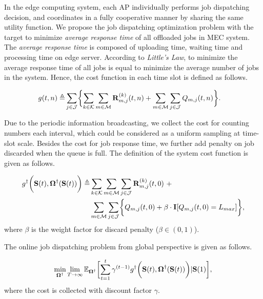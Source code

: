 In the edge computing system, each AP individually performs job dispatching decision, and coordinates in a fully cooperative manner by sharing the same utility function.
We propose the job dispatching optimization problem with the target to minimize \emph{average response time} of all offloaded jobs in MEC system.
The \emph{average response time} is composed of uploading time, waiting time and processing time on edge server.
According to \emph{Little's Law}, to minimize the average response time of all jobs is equal to minimize the average number of jobs in the system.
Hence, the cost function in each time slot is defined as follows.
\begin{definition}
    \begin{align}
        g(t,n) \define & \sum_{j\in\jSpace}\Brace{
            \sum_{k\in\apSet}\sum_{m\in\esSet} \vec{R}^{(k)}_{m,j}(t,n) + \sum_{m\in\esSet}\sum_{j\in\jSpace} Q_{m,j}(t,n)
        }.
    \end{align}
\end{definition}

Due to the periodic information broadcasting, we collect the cost for counting numbers each interval, which could be considered as a uniform sampling at time-slot scale.
Besides the cost for job response time, we further add penalty on job discarded when the queue is full.
The definition of the system cost function is given as follows.
\begin{definition}
    \begin{align}
        g^{\dagger}\Paren{\Stat(t), \Policy^{\dagger}(\Stat(t))} \define
            &\sum_{k\in\apSet} \sum_{m\in\esSet} \sum_{j\in\jSpace} \vec{R}^{(k)}_{m,j}(t,0)~+
            \nonumber\\
            &\sum_{m\in\esSet} \sum_{j\in\jSpace} \Brace{Q_{m,j}(t,0) + \beta \cdot \mat{I}[Q_{m,j}(t,0)=L_{max}]},
    \end{align}
    where $\beta$ is the weight factor for discard penalty ($\beta \in (0,1)$).
\end{definition}

The online job dispatching problem from global perspective is given as follows.
\begin{problem}
    \begin{align}
        \min_{\Policy^{\dagger}} \lim_{T \to \infty}
            \mathbb{E}_{\Policy^{\dagger}}
                \Bracket{\sum_{t=1}^t \gamma^{(t-1)} g^{\dagger}\Paren{\Stat(t), \Policy^{\dagger}(\Stat(t))}|\Stat(1)},
    \end{align}
    where the cost is collected with discount factor $\gamma$.
\end{problem}

